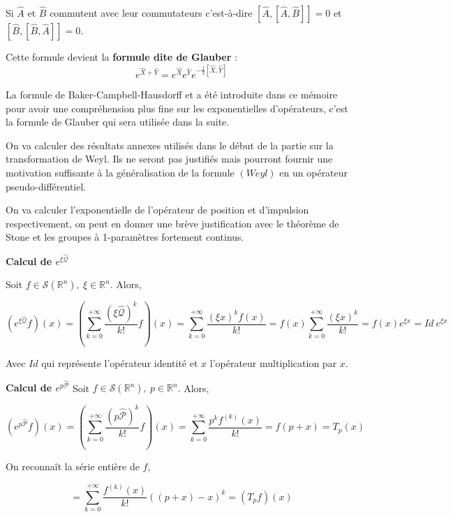 \documentclass[a4paper, 12pt]{report}
\newcommand{\R}{\mathbb{R}} %
\renewcommand{\.}{\cdot} %
\theoremstyle{break}
\theoremstyle{remark}
\theoremstyle{proofstyle}
\begin{document}
Si $\hat{A}$ et $\hat{B}$ commutent avec leur commutateurs c'est-à-dire $[\hat{A},[\hat{A}, \hat{B}]] = 0$ et $[\hat{B}, [\hat{B}, \hat{A}]] = 0$.

Cette formule devient la \textbf{formule dite de Glauber} :
$$e^{\hat{X}+\hat{Y}} = e^{\hat{X}} e^{\hat{Y}}e^{-\frac{1}{2}[\hat{X}, \hat{Y}]}$$\vspace{5pt}

La formule de Baker-Campbell-Hausdorff et a été introduite dans ce mémoire pour avoir une compréhension plus fine sur les exponentielles d'opérateurs, c'est la formule de Glauber qui sera utilisée dans la suite.\vspace{5pt}

On va calculer des résultats annexes utilisés dans le début de la partie sur la transformation de Weyl. Ils ne seront pas justifiés mais pourront fournir une motivation suffisante à la généralisation de la formule $(Weyl)$ en un opérateur pseudo-différentiel.\vspace{5pt}


On va calculer l'exponentielle de l'opérateur de position et d'impulsion respectivement, on peut en donner une brève justification avec le théorème de Stone et les groupes à 1-paramètres fortement continus.

\textbf{Calcul de $e^{\xi \mathcal{\hat{Q}}}$}

Soit $f \in \mathcal{S}(\R^n),~ \xi \in \R^n$. Alors,

$$(e^{\xi \mathcal{\hat{Q}}}f)(x) = \left(\underset{k=0}{\overset{+ \infty}{\sum}} \frac{(\xi \mathcal{\hat{Q}})^k}{k!}f\right)(x) = \underset{k=0}{\overset{+ \infty}{\sum}} \frac{(\xi x)^k f(x)}{k!} = f(x) \underset{k=0}{\overset{+ \infty}{\sum}} \frac{(\xi x)^k}{k!} = f(x) e^{\xi x} = Id ~e^{\xi x}$$

Avec $Id$ qui représente l'opérateur identité et $x$ l'opérateur multiplication par $x$.\vspace{10pt}

\textbf{Calcul de $e^{p \mathcal{\hat{P}}}$}
Soit $f \in \mathcal{S}(\R^n),~ p \in \R^n$. Alors,

$$(e^{p \mathcal{\hat{P}}}f)(x) = \left(\underset{k=0}{\overset{+ \infty}{\sum}} \frac{(p \mathcal{\hat{P}})^k}{k!}f\right)(x) = \underset{k=0}{\overset{+ \infty}{\sum}} \frac{p^k f^{(k)}(x)}{k!} = f(p+x) = T_p(x)$$

On reconnaît la série entière de $f$,

$$= \underset{k=0}{\overset{+ \infty}{\sum}} \frac{f^{(k)}(x)}{k!}((p+x)-x)^k = (T_pf)(x)$$
\end{document}
